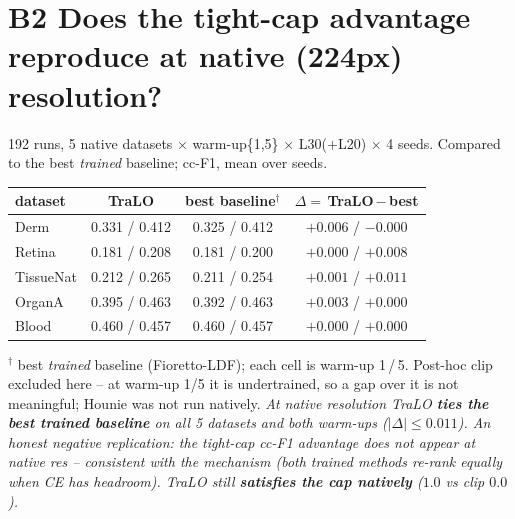 \documentclass[10pt,a4paper]{article}
\newcommand{\vs}[2]{#1\,$-$\,#2}
\newcommand{\fnd}[1]{{\small\textit{#1}}\par}
\newcommand{\tbl}[1]{\begin{center}\footnotesize #1\end{center}}
\begin{document}
\section*{B2 \; Does the tight-cap advantage reproduce at native (224px) resolution?}
{\footnotesize 192 runs, 5 native datasets $\times$ warm-up\{1,5\} $\times$ L30($+$L20) $\times$ 4 seeds.
Compared to the best \emph{trained} baseline; cc-F1, mean over seeds.}
\tbl{\begin{tabular}{lccc}
\toprule
dataset & TraLO & best baseline$^\dagger$ & $\Delta=$\,\vs{TraLO}{best} \\
\midrule
Derm      & 0.331 / 0.412 & 0.325 / 0.412 & $+0.006$ / $-0.000$ \\
Retina    & 0.181 / 0.208 & 0.181 / 0.200 & $+0.000$ / $+0.008$ \\
TissueNat & 0.212 / 0.265 & 0.211 / 0.254 & $+0.001$ / $+0.011$ \\
OrganA    & 0.395 / 0.463 & 0.392 / 0.463 & $+0.003$ / $+0.000$ \\
Blood     & 0.460 / 0.457 & 0.460 / 0.457 & $+0.000$ / $+0.000$ \\
\bottomrule
\end{tabular}}
{\footnotesize $^\dagger$ best \emph{trained} baseline (Fioretto-LDF); each cell is warm-up 1\,/\,5. Post-hoc
clip excluded here -- at warm-up 1/5 it is undertrained, so a gap over it is not meaningful; Hounie was not run
natively.}
\fnd{At native resolution TraLO \textbf{ties the best trained baseline} on all 5 datasets and both warm-ups
($|\Delta|\le0.011$). An honest negative replication: the tight-cap cc-F1 advantage does not appear at native
res -- consistent with the mechanism (both trained methods re-rank equally when CE has headroom). TraLO still
\textbf{satisfies the cap natively} ($1.0$ vs clip $0.0$).}

\end{document}
